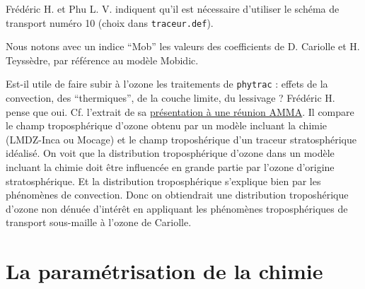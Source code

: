 \documentclass[a4paper,english,french]{article}
\begin{document}
Frédéric H. et Phu L. V. indiquent qu'il est nécessaire d'utiliser le
schéma de transport numéro 10 (choix dans \verb+traceur.def+).

Nous notons avec un indice ``Mob'' les valeurs des coefficients de D.
Cariolle et H. Teyssèdre, par référence au modèle Mobidic.

Est-il utile de faire subir à l'ozone les traitements de
\verb+phytrac+ : effets de la convection, des ``thermiques'', de la
couche limite, du lessivage ? Frédéric H. pense que oui. Cf. l'extrait
de sa
\href{file:///user/guez/Documents/Hourdin_Amma_excerpt.pdf}{présentation
  à une réunion AMMA}. Il compare le champ troposphérique d'ozone
obtenu par un modèle incluant la chimie (LMDZ-Inca ou Mocage) et le
champ troposhérique d'un traceur stratosphérique idéalisé. On voit que
la distribution troposphérique d'ozone dans un modèle incluant la
chimie doit être influencée en grande partie par l'ozone d'origine
stratosphérique. Et la distribution troposphérique s'explique bien par
les phénomènes de convection. Donc on obtiendrait une distribution
troposhérique d'ozone non dénuée d'intérêt en appliquant les
phénomènes troposphériques de transport sous-maille à l'ozone de Cariolle.

\section{La paramétrisation de la chimie}
\end{document}
